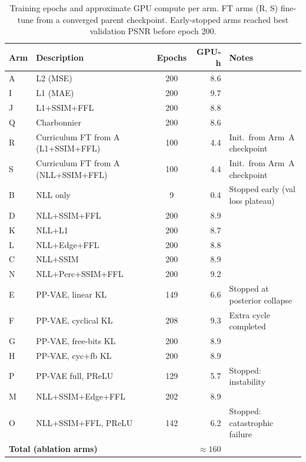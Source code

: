 \documentclass[12pt, a4paper, twoside, openright]{book}
\begin{document}
\begin{appendices}
\begin{table}[htbp]
\centering
\caption[Per-arm training epochs and GPU hours]{Training epochs and approximate GPU compute per arm. FT arms (R, S) fine-tune from a converged parent checkpoint. Early-stopped arms reached best validation PSNR before epoch 200.}
\label{tab:app:hyperparams:arms}
\begin{tabular}{llcrl}
\toprule
\textbf{Arm} & \textbf{Description} & \textbf{Epochs} & \textbf{GPU-h} & \textbf{Notes} \\
\midrule
A  & L2 (MSE)              & 200 & 8.6 & \\
I  & L1 (MAE)              & 200 & 9.7 & \\
J  & L1+SSIM+FFL           & 200 & 8.8 & \\
Q  & Charbonnier           & 200 & 8.6 & \\
R  & Curriculum FT from A (L1+SSIM+FFL) & 100 & 4.4 & Init.\ from Arm~A checkpoint \\
S  & Curriculum FT from A (NLL+SSIM+FFL) & 100 & 4.4 & Init.\ from Arm~A checkpoint \\
B  & NLL only              & 9   & 0.4 & Stopped early (val loss plateau) \\
D  & NLL+SSIM+FFL          & 200 & 8.9 & \\
K  & NLL+L1                & 200 & 8.7 & \\
L  & NLL+Edge+FFL          & 200 & 8.8 & \\
C  & NLL+SSIM              & 200 & 8.9 & \\
N  & NLL+Perc+SSIM+FFL     & 200 & 9.2 & \\
E  & PP-VAE, linear KL     & 149 & 6.6 & Stopped at posterior collapse \\
F  & PP-VAE, cyclical KL   & 208 & 9.3 & Extra cycle completed \\
G  & PP-VAE, free-bits KL  & 200 & 8.9 & \\
H  & PP-VAE, cyc+fb KL     & 200 & 8.9 & \\
P  & PP-VAE full, PReLU    & 129 & 5.7 & Stopped: instability \\
M  & NLL+SSIM+Edge+FFL     & 202 & 8.9 & \\
O  & NLL+SSIM+FFL, PReLU   & 142 & 6.2 & Stopped: catastrophic failure \\
\midrule
\multicolumn{3}{l}{\textbf{Total (ablation arms)}} & $\approx 160$ & \\
\bottomrule
\end{tabular}
\end{table}


\end{appendices}
\end{document}
